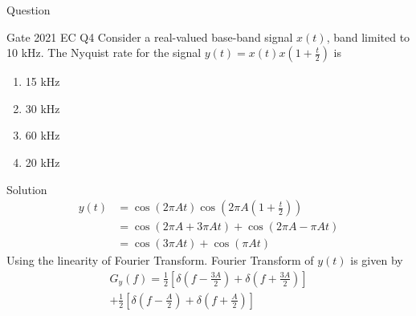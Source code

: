 \documentclass{beamer}
\providecommand{\brak}[1]{\ensuremath{\left(#1\right)}}
\providecommand{\sbrak}[1]{\ensuremath{{}\left[#1\right]}}
\begin{document}
\begin{frame}{Question}
 \begin{block}{Gate 2021 EC Q4}
  Consider a real-valued base-band signal $x\brak{t}$, band limited to 10 kHz. The Nyquist rate for the signal $y\brak{t} = x\brak{t}x\brak{1+\frac{t}{2}}$ is
\begin{enumerate}
    \item 15 kHz
    \item 30 kHz
    \item 60 kHz
    \item 20 kHz
\end{enumerate}
 \end{block}   
\end{frame}
\begin{frame}{Solution}
    \begin{align}
    y\brak{t}&=\cos{\brak{2\pi At}}\cos{\brak{2\pi A\brak{1+\frac{t}{2}}}}\\
    &=\cos{\brak{2\pi A+3\pi At}}+\cos{\brak{2\pi A-\pi At}}\\
    &=\cos{\brak{3\pi At}}+\cos{\brak{\pi At}}\label{yt}
\end{align}
Using the linearity of Fourier Transform. Fourier Transform of $y\brak{t}$ is given by
\begin{multline}
    G_y\brak{f}=\frac{1}{2}\sbrak{\delta\brak{f-\frac{3A}{2}}+\delta\brak{f+\frac{3A}{2}}}\\+\frac{1}{2}\sbrak{\delta\brak{f-\frac{A}{2}}+\delta\brak{f+\frac{A}{2}}}
\end{multline}
\end{frame}
\end{document}
